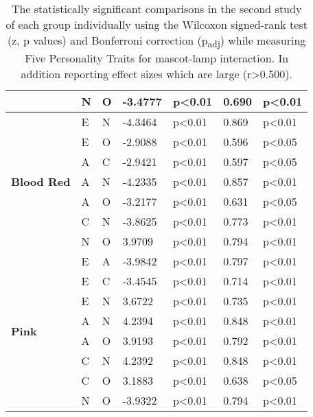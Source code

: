 \begin{table}
\begin{center}
\begin{tabular}{ |p{1.9cm}| p{0.5cm}|p{0.5cm}|p{1.2cm}| p{1.9cm}|p{1cm}|p{1.5cm}|  }
            &N &O &-3.4777 &p<0.01 &0.690 &p<0.01\\
            \hline
            \hline
            \multirow{7}{*}{\textbf{Blood Red}}
            &E &N &-4.3464 &p<0.01 &0.869 &p<0.01\\
            &E &O &-2.9088 &p<0.01 &0.596 &p<0.05\\
            &A &C &-2.9421 &p<0.01 &0.597 &p<0.05\\
            &A &N &-4.2335 &p<0.01 &0.857 &p<0.01\\
            &A &O &-3.2177 &p<0.01 &0.631 &p<0.05\\
            &C &N &-3.8625 &p<0.01 &0.773 &p<0.01\\
            &N &O &3.9709 &p<0.01 &0.794 &p<0.01\\
            \hline
            \hline
            \multirow{8}{*}{\textbf{Pink}}
            &E &A &-3.9842 &p<0.01 &0.797 &p<0.01\\
            &E &C &-3.4545 &p<0.01 &0.714 &p<0.01\\
            &E &N &3.6722 &p<0.01 &0.735 &p<0.01\\
            &A &N &4.2394 &p<0.01 &0.848 &p<0.01\\
            &A &O &3.9193 &p<0.01 &0.792 &p<0.01\\
            &C &N &4.2392 &p<0.01 &0.848 &p<0.01\\
            &C &O &3.1883 &p<0.01 &0.638 &p<0.05\\
            &N &O &-3.9322 &p<0.01 &0.794 &p<0.01\\
            \hline
        \end{tabular}
    \end{center}
    \captionsetup{width=13.5cm}
    \caption{The statistically significant comparisons in the second study of each group individually using the Wilcoxon signed-rank
    test (z, p values) and Bonferroni correction (p\textsubscript{adj}) while measuring Five Personality Traits for mascot-lamp interaction.
    In addition reporting effect sizes which are large (r>0.500).}
    \label{table:wilcoxML2}
\end{table}

